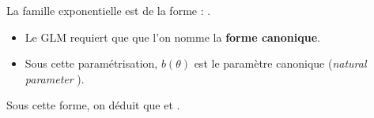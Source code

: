 \documentclass[french]{article}
\begin{document}
\begin{multicols*}{2}
\bigskip

La famille exponentielle est de la forme : .
\begin{itemize}
	\item	Le GLM requiert que  que l'on nomme la \textbf{forme canonique}.
	\item	Sous cette paramétrisation, $b(\theta)$ est le paramètre canonique (\og \textit{natural parameter} \fg{}).
\end{itemize}

Sous cette forme, on déduit que  et .

%
%



\end{multicols*}
\end{document}
